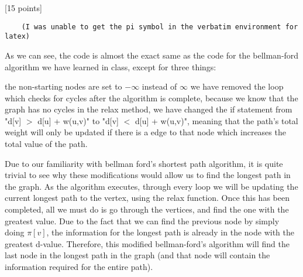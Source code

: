 \documentclass[12pt]{article}
\newcounter{ques}
\newenvironment{question}{\stepcounter{ques}{\noindent\bf Question \arabic{ques}:}}{\vspace{5mm}}
\begin{document}
\begin{question}[15 points]
\begin{verbatim}
    (I was unable to get the pi symbol in the verbatim environment for latex)
  \end{verbatim}

  As we can see, the code is almost the exact same as the code for the bellman-ford algorithm we have learned in class, except for three things:
  \begin{enumerate}
    \li the non-starting nodes are set to $-\infty$ instead of $\infty$
    \li we have removed the loop which checks for cycles after the algorithm is complete, because we know that the graph has no cycles
    \li in the relax method, we have changed the if statement from "d[v] $>$ d[u] + w(u,v)" to "d[v] $<$ d[u] + w(u,v)", meaning that the path's total weight will only be updated if there is a edge to that node which increases the total value of the path.
  \end{enumerate}

  Due to our familiarity with bellman ford's shortest path algorithm, it is quite trivial to see why these modifications would allow us to find the longest path in the graph. As the algorithm executes, through every loop we will be updating the current longest path to the vertex, using the relax function. Once this has been completed, all we must do is go through the vertices, and find the one with the greatest value. Due to the fact that we can find the previous node by simply doing $\pi [v]$, the information for the longest path is already in the node with the greatest d-value. Therefore, this modified bellman-ford's algorithm will find the last node in the longest path in the graph (and that node will contain the information required for the entire path).


\end{question}
\end{document}
